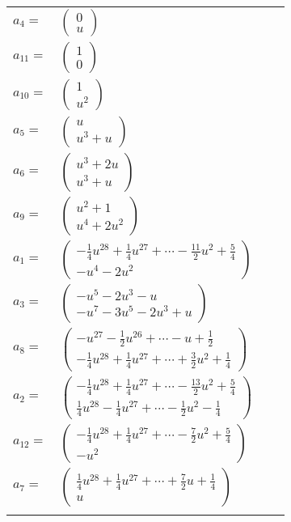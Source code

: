\documentclass[1p]{elsarticle_modified}
\theoremstyle{definition}
\begin{document}
\begin{tabular}{m{7pt} m{180pt} m{7pt} m{180pt} }
\flushright $a_{4}=$&$\begin{pmatrix}0\\u\end{pmatrix}$ \\
\flushright $a_{11}=$&$\begin{pmatrix}1\\0\end{pmatrix}$ \\
\flushright $a_{10}=$&$\begin{pmatrix}1\\u^2\end{pmatrix}$ \\
\flushright $a_{5}=$&$\begin{pmatrix}u\\u^3+u\end{pmatrix}$ \\
\flushright $a_{6}=$&$\begin{pmatrix}u^3+2 u\\u^3+u\end{pmatrix}$ \\
\flushright $a_{9}=$&$\begin{pmatrix}u^2+1\\u^4+2 u^2\end{pmatrix}$ \\
\flushright $a_{1}=$&$\begin{pmatrix}-\frac{1}{4} u^{28}+\frac{1}{4} u^{27}+\cdots-\frac{11}{2} u^2+\frac{5}{4}\\- u^4-2 u^2\end{pmatrix}$ \\
\flushright $a_{3}=$&$\begin{pmatrix}- u^5-2 u^3- u\\- u^7-3 u^5-2 u^3+u\end{pmatrix}$ \\
\flushright $a_{8}=$&$\begin{pmatrix}- u^{27}-\frac{1}{2} u^{26}+\cdots- u+\frac{1}{2}\\-\frac{1}{4} u^{28}+\frac{1}{4} u^{27}+\cdots+\frac{3}{2} u^2+\frac{1}{4}\end{pmatrix}$ \\
\flushright $a_{2}=$&$\begin{pmatrix}-\frac{1}{4} u^{28}+\frac{1}{4} u^{27}+\cdots-\frac{13}{2} u^2+\frac{5}{4}\\\frac{1}{4} u^{28}-\frac{1}{4} u^{27}+\cdots-\frac{1}{2} u^2-\frac{1}{4}\end{pmatrix}$ \\
\flushright $a_{12}=$&$\begin{pmatrix}-\frac{1}{4} u^{28}+\frac{1}{4} u^{27}+\cdots-\frac{7}{2} u^2+\frac{5}{4}\\- u^2\end{pmatrix}$ \\
\flushright $a_{7}=$&$\begin{pmatrix}\frac{1}{4} u^{28}+\frac{1}{4} u^{27}+\cdots+\frac{7}{2} u+\frac{1}{4}\\u\end{pmatrix}$\\&\end{tabular}
\end{document}

